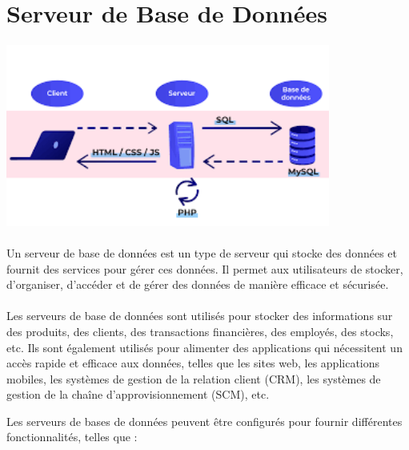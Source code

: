 \section{Serveur de Base de Données }
\vspace{4mm}
\paragraph{
	\includegraphics[width=0.8\textwidth]{PhotoMemoire/serveur_bdd.png}}
\paragraph{ }
Un serveur de base de données est un type de serveur qui stocke des données et fournit des services pour gérer ces données. Il permet aux utilisateurs de stocker, d'organiser, d'accéder et de gérer des données de manière efficace et sécurisée.
\paragraph{ }
Les serveurs de base de données sont utilisés pour stocker des informations sur des produits, des clients, des transactions financières, des employés, des stocks, etc. Ils sont également utilisés pour alimenter des applications qui nécessitent un accès rapide et efficace aux données, telles que les sites web, les applications mobiles, les systèmes de gestion de la relation client (CRM), les systèmes de gestion de la chaîne d'approvisionnement (SCM), etc.

Les serveurs de bases de données peuvent être configurés pour fournir différentes fonctionnalités, telles que :


